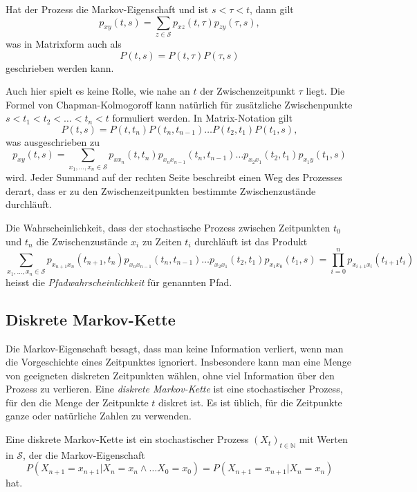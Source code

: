 \begin{satz}
Hat der Prozess die Markov-Eigenschaft und ist $s<\tau <t$, dann gilt
\[
p_{xy}(t,s) = \sum_{z\in\mathcal{S}} p_{xz}(t,\tau) p_{zy}(\tau,s),
\]
was in Matrixform auch als
\[
P(t,s) = P(t,\tau)P(\tau,s)
\]
geschrieben werden kann.
\end{satz}

Auch hier spielt es keine Rolle, wie nahe an $t$ der Zwischenzeitpunkt
$\tau$ liegt.
Die Formel von Chapman-Kolmogoroff kann natürlich für zusätzliche
Zwischenpunkte $s<t_1<t_2<\dots< t_n< t$ formuliert werden.
In Matrix-Notation gilt
\[
P(t,s) = P(t,t_n)P(t_n,t_{n-1})\dots P(t_2,t_1)P(t_1,s),
\]
was ausgeschrieben zu
\[
p_{xy}(t,s)
=
\sum_{x_1,\dots,x_n\in\mathcal{S}}
p_{xx_n}(t,t_n)
p_{x_nx_{n-1}}(t_n,t_{n-1})
\dots
p_{x_2x_1}(t_2,t_1)
p_{x_1y}(t_1,s)
\]
wird.
Jeder Summand auf der rechten Seite beschreibt einen Weg des Prozesses
derart, dass er zu den Zwischenzeitpunkten bestimmte 
Zwischenzustände durchläuft.

\begin{definition}
Die Wahrscheinlichkeit, dass der stochastische Prozess zwischen Zeitpunkten
$t_0$ und $t_n$ die Zwischenzustände $x_i$ zu Zeiten $t_i$ durchläuft ist
das Produkt
\[
\sum_{x_1,\dots,x_n\in\mathcal{S}}
p_{x_{n+1}x_n}(t_{n+1},t_n)
p_{x_nx_{n-1}}(t_n,t_{n-1})
\dots
p_{x_2x_1}(t_2,t_1)
p_{x_1x_0}(t_1,s)
=
\prod_{i=0}^{n}
p_{x_{i+1}x_i}(t_{i+1}t_i)
\]
heisst die {\em Pfadwahrscheinlichkeit} für genannten Pfad.
%
\end{definition}

\subsection{Diskrete Markov-Kette}
Die Markov-Eigenschaft besagt, dass man keine Information verliert,
wenn man die Vorgeschichte eines Zeitpunktes ignoriert.
Insbesondere kann man eine Menge von geeigneten diskreten
Zeitpunkten wählen, ohne viel Information über den Prozess zu
verlieren.
Eine {\em diskrete Markov-Kette} ist eine stochastischer Prozess,
für den die Menge der Zeitpunkte $t$ diskret ist.
Es ist üblich, für die Zeitpunkte ganze oder natürliche Zahlen zu
verwenden.

\begin{definition}
Eine diskrete Markov-Kette ist ein stochastischer Prozess
$(X_t)_{t\in\mathbb{N}}$ mit Werten in $\mathcal{S}$, der die
Markov-Eigenschaft
\[
P(X_{n+1}=x_{n+1}|X_n=x_n\wedge\dots X_0=x_0)
=
P(X_{n+1}=x_{n+1}|X_n=x_n)
\]
hat.
\end{definition}

